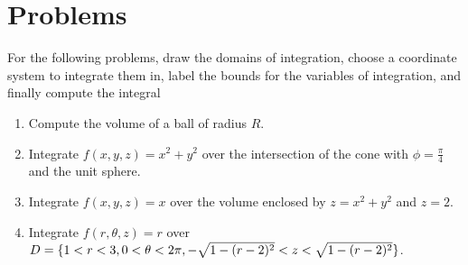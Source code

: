 \documentclass[letterpaper,11pt]{article}
\begin{document}
\section*{Problems}
For the following problems, draw the domains of integration, choose a coordinate system to integrate them in,
label the bounds for the variables of integration, and finally compute the integral
\begin{enumerate}
\item Compute the volume of a ball of radius $R$.\\
  \newline
  \newline
  \newline
  \newline
  \newline
  \newline
  \newline
\item Integrate $f(x, y, z) = x^2 + y^2$ over the intersection of the cone with $\phi = \frac{\pi}{4}$ and the unit sphere.\\
  \newline
  \newline
  \newline
  \newline
  \newline
  \newline
  \newline
\item Integrate $f(x, y, z) = x$ over the volume enclosed by $z = x^2 + y^2$ and $z = 2$.\\
  \newline
  \newline
  \newline
  \newline
  \newline
  \newline
  \newline
  \newline
\item Integrate $f(r, \theta, z) = r$ over $D = \{ 1 < r < 3, 0 < \theta < 2 \pi, -\sqrt{1 - (r - 2)^2} < z < \sqrt{1 - (r - 2)^2} \}$.\\
  \newline
  \newline
  \newline
  \newline
  \newline
  \newline
  \newline

\end{enumerate}
\end{document}
